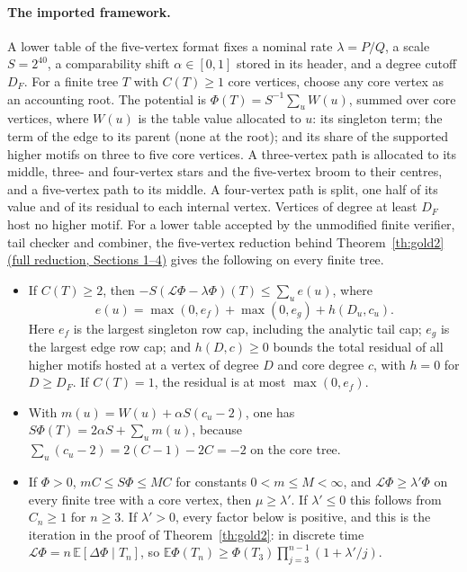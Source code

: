 \documentclass[11pt]{article}
\newcommand{\proofsrc}[2]{\href{https://github.com/uzay-eth/friend-tree-exponent/blob/a0972085ad72ad5685ae7b424988648d1965e73c/#1}{#2}}
\theoremstyle{remark}
\numberwithin{equation}{section}
\newcommand{\E}{\mathbb E}
\begin{document}
\paragraph{The imported framework.}
A lower table of the five-vertex format fixes a nominal rate $\lambda=P/Q$, a scale $S=2^{40}$, a comparability shift $\alpha\in[0,1]$ stored in its header, and a degree cutoff $D_F$. For a finite tree $T$ with $C(T)\ge1$ core vertices, choose any core vertex as an accounting root. The potential is $\Phi(T)=S^{-1}\sum_uW(u)$, summed over core vertices, where $W(u)$ is the table value allocated to $u$: its singleton term; the term of the edge to its parent (none at the root); and its share of the supported higher motifs on three to five core vertices. A three-vertex path is allocated to its middle, three- and four-vertex stars and the five-vertex broom to their centres, and a five-vertex path to its middle. A four-vertex path is split, one half of its value and of its residual to each internal vertex. Vertices of degree at least $D_F$ host no higher motif. For a lower table accepted by the unmodified finite verifier, tail checker and combiner, the five-vertex reduction behind Theorem~\ref{th:gold2} \proofsrc{round2/proofs/neon2/quintet-cert/PROOF.md}{(full reduction, Sections 1--4)} gives the following on every finite tree.
\begin{itemize}\setlength{\itemsep}{0pt}
\item[(R1)] If $C(T)\ge2$, then $-S(\mathcal L\Phi-\lambda\Phi)(T)\le\sum_ue(u)$, where
\[
 e(u)=\max(0,e_f)+\max(0,e_g)+h(D_u,c_u).
\]
Here $e_f$ is the largest singleton row cap, including the analytic tail cap; $e_g$ is the largest edge row cap; and $h(D,c)\ge0$ bounds the total residual of all higher motifs hosted at a vertex of degree $D$ and core degree $c$, with $h=0$ for $D\ge D_F$. If $C(T)=1$, the residual is at most $\max(0,e_f)$.
\item[(R2)] With $m(u)=W(u)+\alpha S(c_u-2)$, one has $S\Phi(T)=2\alpha S+\sum_um(u)$, because $\sum_u(c_u-2)=2(C-1)-2C=-2$ on the core tree.
\item[(R3)] If $\Phi>0$, $mC\le S\Phi\le MC$ for constants $0<m\le M<\infty$, and $\mathcal L\Phi\ge\lambda'\Phi$ on every finite tree with a core vertex, then $\mu\ge\lambda'$. If $\lambda'\le0$ this follows from $C_n\ge1$ for $n\ge3$. If $\lambda'>0$, every factor below is positive, and this is the iteration in the proof of Theorem~\ref{th:gold2}: in discrete time $\mathcal L\Phi=n\,\E[\Delta\Phi\mid T_n]$, so $\E\Phi(T_n)\ge\Phi(T_3)\prod_{j=3}^{n-1}(1+\lambda'/j)$.
\end{itemize}
\end{document}
